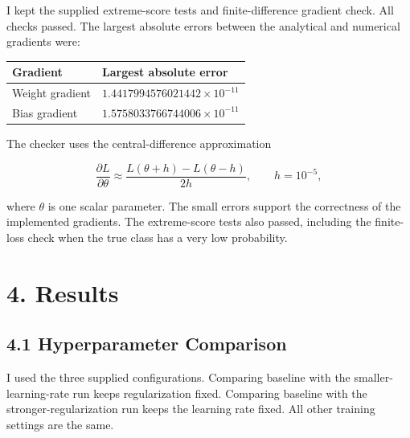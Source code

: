 \documentclass[UTF8,a4paper,12pt,fontset=fandol]{ctexart}
\begin{document}
I kept the supplied extreme-score tests and finite-difference gradient check. All checks passed. The largest absolute errors between the analytical and numerical gradients were:

\begin{center}
\begingroup
\normalsize
\setlength{\tabcolsep}{6pt}
\renewcommand{\arraystretch}{1.18}
\setlength{\extrarowheight}{2pt}
\renewcommand{\tabularxcolumn}[1]{m{#1}}
\begin{tabularx}{\linewidth}{@{}>{\raggedright\arraybackslash}m{5.2cm}>{\centering\arraybackslash}X@{}}
\toprule
\textbf{Gradient} & \textbf{Largest absolute error} \\
\midrule
Weight gradient & \(1.4417994576021442\times10^{-11}\) \\
Bias gradient & \(1.5758033766744006\times10^{-11}\) \\
\bottomrule
\end{tabularx}
\endgroup
\end{center}

The checker uses the central-difference approximation

\[
\frac{\partial L}{\partial\theta}
\approx\frac{L(\theta+h)-L(\theta-h)}{2h},
\qquad h=10^{-5},
\]

where \(\theta\) is one scalar parameter. The small errors support the correctness of the implemented gradients. The extreme-score tests also passed, including the finite-loss check when the true class has a very low probability.

\section*{4. Results}

\subsection*{4.1 Hyperparameter Comparison}

I used the three supplied configurations. Comparing baseline with the smaller-learning-rate run keeps regularization fixed. Comparing baseline with the stronger-regularization run keeps the learning rate fixed. All other training settings are the same.
\end{document}
